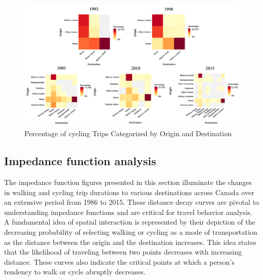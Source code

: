 \documentclass[12pt,twoside]{reedthesis}
\begin{document}
\clearpage
\newpage
\thispagestyle{empty}
\begin{landscape}
\begin{figure}

{\centering \includegraphics[width=1\linewidth]{heat-c} 

}

\caption{Percentage of cycling Trips Categorized by Origin and Destination}\label{fig:heat-c}
\end{figure}
\end{landscape}
\clearpage

\hypertarget{impedance-function-analysis}{%
\subsection{Impedance function analysis}\label{impedance-function-analysis}}

The impedance function figures presented in this section illuminate the changes in walking and cycling trip durations to various destinations across Canada over an extensive period from 1986 to 2015. These distance decay curves are pivotal to understanding impedance functions and are critical for travel behavior analysis. A fundamental idea of spatial interaction is represented by their depiction of the decreasing probability of selecting walking or cycling as a mode of transportation as the distance between the origin and the destination increases. This idea states that the likelihood of traveling between two points decreases with increasing distance. These curves also indicate the critical points at which a person's tendency to walk or cycle abruptly decreases.
\end{document}
